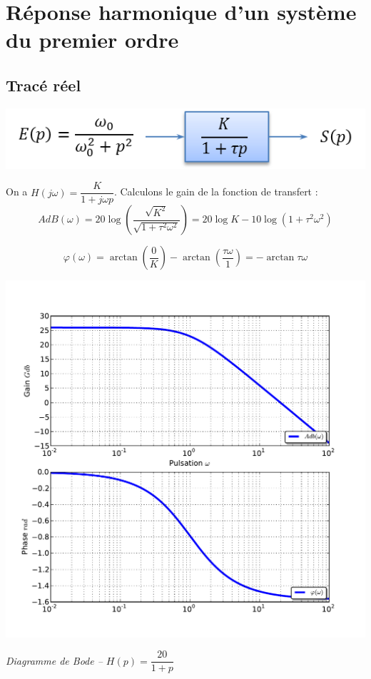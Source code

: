 \documentclass[10pt,oneside]{article}
\begin{document}
\section{Réponse harmonique d'un système du premier ordre}

\subsection{Tracé réel}
\begin{minipage}[c]{.48\linewidth}
\begin{center}
\includegraphics[width=.9\textwidth]{png/ordre1_bloc}
\end{center}

On a $H(j\omega)=\dfrac{K}{1+j\omega p}$. Calculons le gain de la fonction de transfert :
$$
AdB(\omega) 
= 20\log \left(\dfrac{ \sqrt{ K^2} }{\sqrt{1+\tau^2\omega^2}}\right)
= 20\log K - 10 \log \left( 1+\tau^2\omega^2\right)
$$

$$
\varphi(\omega) 
= \arctan\left( \dfrac{0}{K}\right)-\arctan\left( \dfrac{\tau\omega}{1}\right)
= -\arctan\tau\omega
$$
\end{minipage}\hfill
\begin{minipage}[c]{.48\linewidth}
\begin{center}
\includegraphics[width=.9\textwidth]{png/ordre1_bode}

\textit{Diagramme de Bode -- $H(p)=\dfrac{20}{1+p}$}
\end{center}
\end{minipage}
\end{document}
